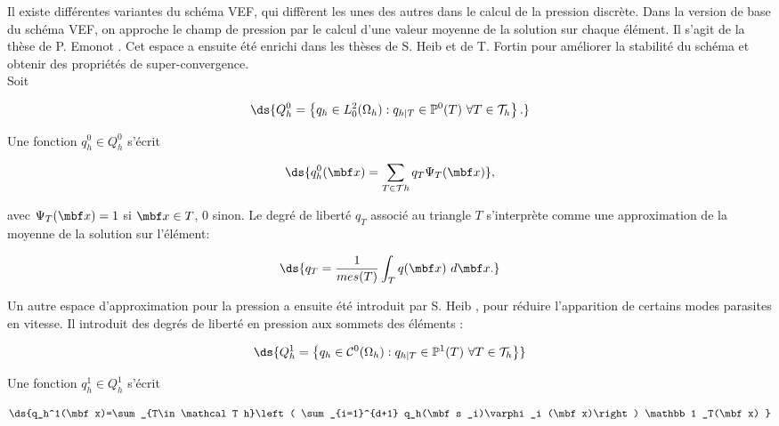 \begin{appendix}
Il existe diff\'erentes variantes du sch\'ema VEF, qui diff\`erent les unes des autres dans le calcul de la pression discr\`ete. Dans la version de base du sch\'ema VEF, on approche le champ
de pression par le calcul d'une valeur moyenne de la solution sur chaque \'el\'ement. Il s'agit de la th\`ese de P. Emonot \cite{Emonot}. Cet espace a ensuite \'et\'e enrichi dans les
th\`eses de S. Heib \cite{Heib} et de T. Fortin \cite{Fortin} pour am\'eliorer la stabilit\'e du sch\'ema et obtenir des propri\'et\'es de super-convergence.\\

Soit 

\begin{equation}
\ds{
Q_h^0 = \left\lbrace q_h\in L_0^2(\Omega _h): q_{h|T} \in \mathbb P^0(T)\ \forall T\in \mathcal T _h\right\rbrace.
}
\end{equation}

Une fonction $q_h^0\in Q_h^0$ s'\'ecrit 

\begin{equation}
\ds{
q_h^0(\mbf x)=\sum _{T\in \mathcal T h}q_T\Psi _T(\mbf x) },
\end{equation}

 avec $\Psi _T(\mbf x)=1 $ si $\mbf x\in T$, $0$ sinon. Le degr\'e de libert\'e $q_T$ associ\'e au triangle $T$ s'interpr\`ete comme une approximation de la moyenne de la solution sur
 l'\'el\'ement:

\begin{equation}
\ds{q_T=\frac{1}{mes(T)}\int _T q(\mbf x)\ d\mbf x.}
\end{equation}

Un autre espace d'approximation pour la pression a ensuite \'et\'e introduit par S. Heib \cite{Heib}, pour r\'eduire l'apparition de certains modes parasites en vitesse. Il introduit des
degr\'es de libert\'e en pression aux sommets des \'el\'ements :

\begin{equation}
\ds{
Q_h^1 = \left\lbrace q_h\in \mathcal C ^0(\Omega _h): q_{h|T} \in \mathbb P^1(T) \ \forall T\in \mathcal T _h\right\rbrace
}
\end{equation}

Une fonction $q_h^1\in Q_h^1$ s'\'ecrit 

\begin{equation}
\ds{q_h^1(\mbf x)=\sum _{T\in \mathcal T h}\left( \sum _{i=1}^{d+1} q_h(\mbf s _i)\varphi _i (\mbf x)\right) \mathbb 1 _T(\mbf x) } 
\end{equation}


\end{appendix}
